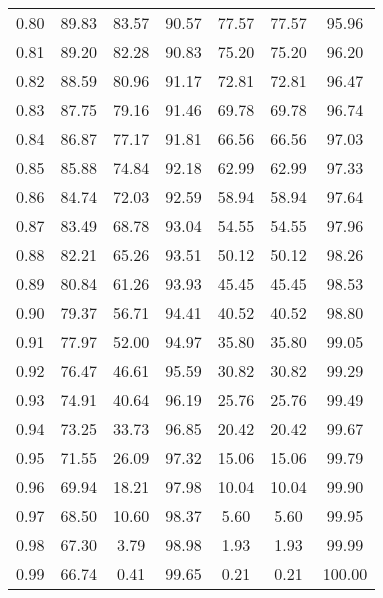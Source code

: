\begin{tabular}{|c|c|c|c|c|c|c|}
      0.80 &     89.83 &     83.57 &      90.57 &   77.57 &      77.57 &         95.96 \\
      0.81 &     89.20 &     82.28 &      90.83 &   75.20 &      75.20 &         96.20 \\
      0.82 &     88.59 &     80.96 &      91.17 &   72.81 &      72.81 &         96.47 \\
      0.83 &     87.75 &     79.16 &      91.46 &   69.78 &      69.78 &         96.74 \\
      0.84 &     86.87 &     77.17 &      91.81 &   66.56 &      66.56 &         97.03 \\
      0.85 &     85.88 &     74.84 &      92.18 &   62.99 &      62.99 &         97.33 \\
      0.86 &     84.74 &     72.03 &      92.59 &   58.94 &      58.94 &         97.64 \\
      0.87 &     83.49 &     68.78 &      93.04 &   54.55 &      54.55 &         97.96 \\
      0.88 &     82.21 &     65.26 &      93.51 &   50.12 &      50.12 &         98.26 \\
      0.89 &     80.84 &     61.26 &      93.93 &   45.45 &      45.45 &         98.53 \\
      0.90 &     79.37 &     56.71 &      94.41 &   40.52 &      40.52 &         98.80 \\
      0.91 &     77.97 &     52.00 &      94.97 &   35.80 &      35.80 &         99.05 \\
      0.92 &     76.47 &     46.61 &      95.59 &   30.82 &      30.82 &         99.29 \\
      0.93 &     74.91 &     40.64 &      96.19 &   25.76 &      25.76 &         99.49 \\
      0.94 &     73.25 &     33.73 &      96.85 &   20.42 &      20.42 &         99.67 \\
      0.95 &     71.55 &     26.09 &      97.32 &   15.06 &      15.06 &         99.79 \\
      0.96 &     69.94 &     18.21 &      97.98 &   10.04 &      10.04 &         99.90 \\
      0.97 &     68.50 &     10.60 &      98.37 &    5.60 &       5.60 &         99.95 \\
      0.98 &     67.30 &      3.79 &      98.98 &    1.93 &       1.93 &         99.99 \\
      0.99 &     66.74 &      0.41 &      99.65 &    0.21 &       0.21 &        100.00 \\
\bottomrule
\end{tabular}
